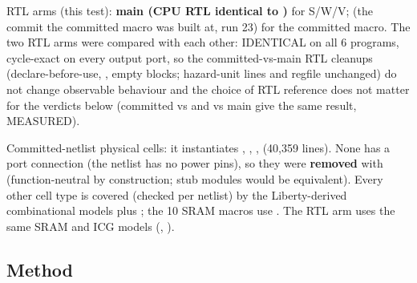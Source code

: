 \begin{record}
RTL arms (this test): \textbf{main (CPU RTL identical to
)} for S/W/V; \textbf{} (the commit the
committed macro was built at,  run 23) for the committed macro.
The two RTL arms were compared with each other: IDENTICAL on all 6
programs, cycle-exact on every output port, so the committed-vs-main RTL
cleanups (declare-before-use, , empty blocks;
hazard-unit lines and regfile unchanged) do not change observable
behaviour and the choice of RTL reference does not matter for the
verdicts below (committed vs  and vs main give the same
result, MEASURED).

Committed-netlist physical cells: it instantiates
, , , 
(40,359 lines). None has a port connection (the netlist has no power
pins), so they were \textbf{removed} with 
(function-neutral by construction; stub modules would be equivalent).
Every other cell type is covered (checked per netlist) by the
Liberty-derived combinational models plus
; the 10 SRAM macros use
. The RTL arm uses the same SRAM and
ICG models (, ).

\end{record}

\subsection{Method}\label{cr:defect:asap7-cpu-synlig-ma7:method}

